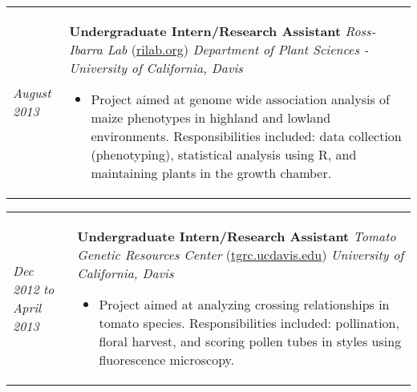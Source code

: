 ﻿\documentclass[a4paper]{article}
\begin{document}
\begin{tabular}{p{3cm} p{14cm}}
\textit{August 2013}\newline
& 
\vspace{0pt}
\textbf{Undergraduate Intern/Research Assistant}\newline
\textit{Ross-Ibarra Lab} (\href{http://www.rilab.org/}{rilab.org})\newline
\textit{Department of Plant Sciences - University of California, Davis}
\begin{itemize}[noitemsep,topsep=0pt]
  \item Project aimed at genome wide association analysis of maize phenotypes in highland and lowland environments. Responsibilities included: data collection (phenotyping), statistical analysis using R, and maintaining plants in the growth chamber.
\end{itemize}
\end{tabular}
\begin{tabular}{p{3cm} p{14cm}}
%
\\
%
\vspace{0pt} 
\textit{Dec 2012}\newline
\textit{to}\newline
\textit{April 2013}\newline
&
\vspace{0pt}
\textbf{Undergraduate Intern/Research Assistant}\newline
\textit{Tomato Genetic Resources Center} (\href{http://tgrc.ucdavis.edu/}{tgrc.ucdavis.edu})\newline
\textit{University of California, Davis}
\begin{itemize}[noitemsep,topsep=0pt]
  \item Project aimed at analyzing crossing relationships in tomato species. Responsibilities included: pollination, floral harvest, and scoring pollen tubes in styles using fluorescence microscopy.
\end{itemize}
\end{tabular}
\end{document}
